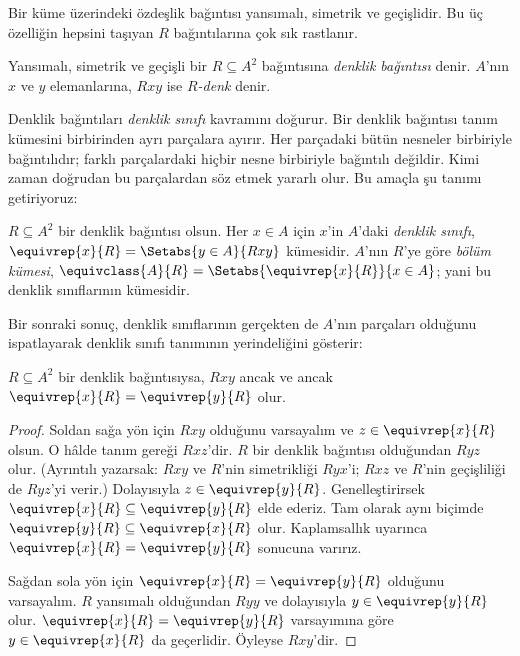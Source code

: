 



Bir küme üzerindeki özdeşlik bağıntısı yansımalı, simetrik ve geçişlidir. Bu üç
özelliğin hepsini taşıyan $R$ bağıntılarına çok sık rastlanır.

\begin{defn}
Yansımalı, simetrik ve geçişli bir $R \subseteq A^2$ bağıntısına \emph{denklik
bağıntısı} denir. $A$'nın $x$ ve $y$ elemanlarına, $Rxy$ ise
\emph{$R$-denk} denir.
\end{defn}

Denklik bağıntıları \emph{denklik sınıfı} kavramını doğurur. Bir denklik
bağıntısı tanım kümesini birbirinden ayrı parçalara ayırır. Her parçadaki bütün
nesneler birbiriyle bağıntılıdır; farklı parçalardaki hiçbir nesne birbiriyle
bağıntılı değildir. Kimi zaman doğrudan bu parçalardan söz etmek yararlı olur.
Bu amaçla şu tanımı getiriyoruz:

\begin{defn}
$R \subseteq A^2$ bir denklik bağıntısı olsun. Her $x \in A$ için $x$'in
$A$'daki \emph{denklik sınıfı},
$\equivrep{x}{R}=\Setabs{y \in A}{Rxy}$ kümesidir. $A$'nın $R$'ye göre
\emph{bölüm kümesi},
$\equivclass{A}{R}=\Setabs{\equivrep{x}{R}}{x \in A}$; yani bu denklik
sınıflarının kümesidir.
\end{defn}

Bir sonraki sonuç, denklik sınıflarının gerçekten de $A$'nın parçaları
olduğunu ispatlayarak denklik sınıfı tanımının yerindeliğini gösterir:

\begin{prop}
$R \subseteq A^2$ bir denklik bağıntısıysa, $Rxy$ ancak ve ancak
$\equivrep{x}{R}=\equivrep{y}{R}$ olur.
\end{prop}

\begin{proof}
Soldan sağa yön için $Rxy$ olduğunu varsayalım ve
$z \in \equivrep{x}{R}$ olsun. O hâlde tanım gereği $Rxz$'dir. $R$ bir denklik
bağıntısı olduğundan $Ryz$ olur. (Ayrıntılı yazarsak: $Rxy$ ve $R$'nin
simetrikliği $Ryx$'i; $Rxz$ ve $R$'nin geçişliliği de $Ryz$'yi verir.)
Dolayısıyla $z \in \equivrep{y}{R}$. Genelleştirirsek
$\equivrep{x}{R} \subseteq \equivrep{y}{R}$ elde ederiz. Tam olarak aynı
biçimde $\equivrep{y}{R} \subseteq \equivrep{x}{R}$ olur. Kaplamsallık
uyarınca $\equivrep{x}{R}=\equivrep{y}{R}$ sonucuna varırız.

Sağdan sola yön için $\equivrep{x}{R}=\equivrep{y}{R}$ olduğunu varsayalım.
$R$ yansımalı olduğundan $Ryy$ ve dolayısıyla
$y \in \equivrep{y}{R}$ olur. $\equivrep{x}{R}=\equivrep{y}{R}$ varsayımına
göre $y \in \equivrep{x}{R}$ da geçerlidir. Öyleyse $Rxy$'dir.
\end{proof}

